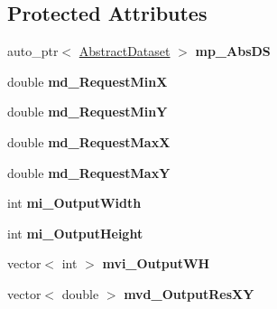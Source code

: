 \subsection*{Protected Attributes}
\begin{DoxyCompactItemize}
\item 
\hypertarget{classWCS__GetCoverage_a0b020807d7c60cdaf046d44d3edce819}{
auto\_\-ptr$<$ \hyperlink{classAbstractDataset}{AbstractDataset} $>$ {\bfseries mp\_\-AbsDS}}
\label{classWCS__GetCoverage_a0b020807d7c60cdaf046d44d3edce819}

\item 
\hypertarget{classWCS__GetCoverage_aca3c07c25bff3602c7e40013975ee35e}{
double {\bfseries md\_\-RequestMinX}}
\label{classWCS__GetCoverage_aca3c07c25bff3602c7e40013975ee35e}

\item 
\hypertarget{classWCS__GetCoverage_a1fce35d813d5d03123ceba262e08e17f}{
double {\bfseries md\_\-RequestMinY}}
\label{classWCS__GetCoverage_a1fce35d813d5d03123ceba262e08e17f}

\item 
\hypertarget{classWCS__GetCoverage_a7be6a006f5e415b000e414c679ddc3fa}{
double {\bfseries md\_\-RequestMaxX}}
\label{classWCS__GetCoverage_a7be6a006f5e415b000e414c679ddc3fa}

\item 
\hypertarget{classWCS__GetCoverage_af59dd0be9bf9071e728566f188f340a2}{
double {\bfseries md\_\-RequestMaxY}}
\label{classWCS__GetCoverage_af59dd0be9bf9071e728566f188f340a2}

\item 
\hypertarget{classWCS__GetCoverage_a3bfddcafea9a4e37a5c9b907cdb22f05}{
int {\bfseries mi\_\-OutputWidth}}
\label{classWCS__GetCoverage_a3bfddcafea9a4e37a5c9b907cdb22f05}

\item 
\hypertarget{classWCS__GetCoverage_a983a30695a9383899f37e6122a256707}{
int {\bfseries mi\_\-OutputHeight}}
\label{classWCS__GetCoverage_a983a30695a9383899f37e6122a256707}

\item 
\hypertarget{classWCS__GetCoverage_a9af081fe2292169313de72854de2ae65}{
vector$<$ int $>$ {\bfseries mvi\_\-OutputWH}}
\label{classWCS__GetCoverage_a9af081fe2292169313de72854de2ae65}

\item 
\hypertarget{classWCS__GetCoverage_a35d80545e0d1c13ba2a87e047a8ff46c}{
vector$<$ double $>$ {\bfseries mvd\_\-OutputResXY}}
\label{classWCS__GetCoverage_a35d80545e0d1c13ba2a87e047a8ff46c}


\end{DoxyCompactItemize}
